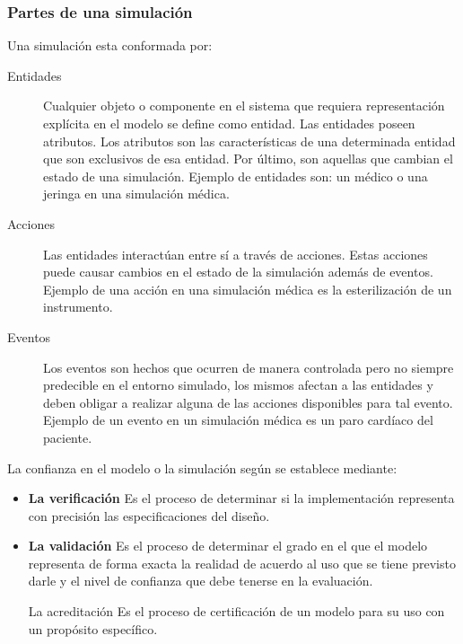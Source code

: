 \subsubsection{Partes de una simulación}

Una simulación esta conformada por:

\begin{description}

\item[Entidades] Cualquier objeto o componente en el sistema que requiera
	representación explícita en el modelo se define como
	entidad\cite{banks2000dm}. Las entidades poseen atributos. Los atributos
	son las características de una determinada entidad que son exclusivos de
	esa entidad. Por último, son aquellas que cambian el estado de una
	simulación. Ejemplo de entidades son: un médico o una jeringa en una
	simulación médica.

\item[Acciones] Las entidades interactúan entre sí a través de acciones. Estas
	acciones puede causar cambios en el estado de la simulación además de
	eventos. Ejemplo de una acción en una simulación médica es la
	esterilización de un instrumento.

\item[Eventos] Los eventos son hechos que ocurren de manera controlada pero no
	siempre predecible en el entorno simulado, los mismos afectan a las
	entidades y deben obligar a realizar alguna de las acciones disponibles
	para tal evento. Ejemplo de un evento en un simulación médica es un paro
	cardíaco del paciente.

\end{description}

La confianza en el modelo o la simulación según\cite{DoDSysEng2001} se establece
mediante:

\begin{itemize}

\item \textbf{La verificación} Es el proceso de determinar si la implementación
	representa con precisión las especificaciones del diseño. 

\item \textbf{La validación} Es el proceso de determinar el grado en el que el modelo
	representa de forma exacta la realidad de acuerdo al uso que se tiene
	previsto darle y el nivel de confianza que debe tenerse en la
	evaluación.

\item[La acreditación] Es el proceso de certificación de un modelo para su uso
	con un propósito específico.

\end{itemize}



